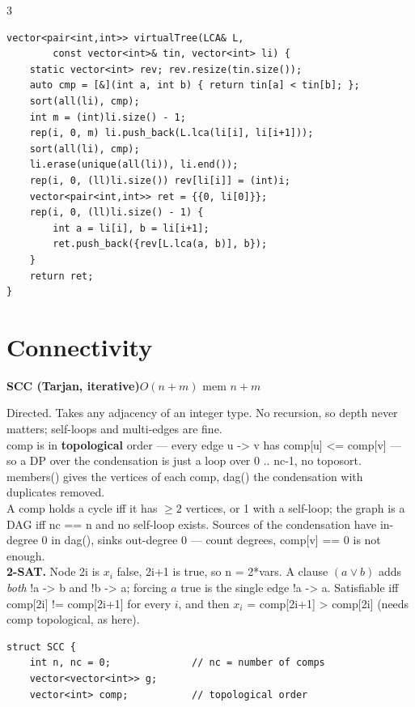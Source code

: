 \documentclass[9pt,a4paper]{extarticle}
\newcommand{\entry}[3]{%
  \addcontentsline{toc}{subsection}{#1}%
  \vspace{0.8ex}%
  \noindent\colorbox{hdbg}{\parbox{\dimexpr\columnwidth-2\fboxsep}{%
    \strut\textbf{#1}\hfill{\footnotesize\textsf{#2}}}}\par
  \vspace{0.4ex}%
  {\footnotesize #3\par}%
}
\newcommand{\code}[1]{{\ttfamily\small #1}}
\begin{document}
\begin{multicols*}{3}
\begin{lstlisting}
vector<pair<int,int>> virtualTree(LCA& L,
        const vector<int>& tin, vector<int> li) {
    static vector<int> rev; rev.resize(tin.size());
    auto cmp = [&](int a, int b) { return tin[a] < tin[b]; };
    sort(all(li), cmp);
    int m = (int)li.size() - 1;
    rep(i, 0, m) li.push_back(L.lca(li[i], li[i+1]));
    sort(all(li), cmp);
    li.erase(unique(all(li)), li.end());
    rep(i, 0, (ll)li.size()) rev[li[i]] = (int)i;
    vector<pair<int,int>> ret = {{0, li[0]}};
    rep(i, 0, (ll)li.size() - 1) {
        int a = li[i], b = li[i+1];
        ret.push_back({rev[L.lca(a, b)], b});
    }
    return ret;
}
\end{lstlisting}

\section{Connectivity}

\entry{SCC (Tarjan, iterative)}{$O(n + m)$ \quad mem $n + m$}{%
Directed. Takes any adjacency of an integer type. No recursion, so depth never matters;
self-loops and multi-edges are fine.\\[0.3ex]
\code{comp} is in \textbf{topological} order --- every edge \code{u -> v} has
\code{comp[u] <= comp[v]} --- so a DP over the condensation is just a loop over
\code{0 .. nc-1}, no toposort. \code{members()} gives the vertices of each comp,
\code{dag()} the condensation with duplicates removed.\\[0.3ex]
A comp holds a cycle iff it has $\ge 2$ vertices, or 1 with a self-loop; the graph is a
DAG iff \code{nc == n} and no self-loop exists. Sources of the condensation have
in-degree 0 in \code{dag()}, sinks out-degree 0 --- count degrees, \code{comp[v] == 0}
is not enough.\\[0.3ex]
\textbf{2-SAT.} Node \code{2i} is $x_i$ false, \code{2i+1} is true, so \code{n = 2*vars}.
A clause $(a \lor b)$ adds \emph{both} \code{!a -> b} and \code{!b -> a}; forcing $a$
true is the single edge \code{!a -> a}. Satisfiable iff
\code{comp[2i] != comp[2i+1]} for every $i$, and then
$x_i$ = \code{comp[2i+1] > comp[2i]} (needs \code{comp} topological, as here).}

\begin{lstlisting}
struct SCC {
    int n, nc = 0;              // nc = number of comps
    vector<vector<int>> g;
    vector<int> comp;           // topological order


\end{lstlisting}
\end{multicols*}
\end{document}
